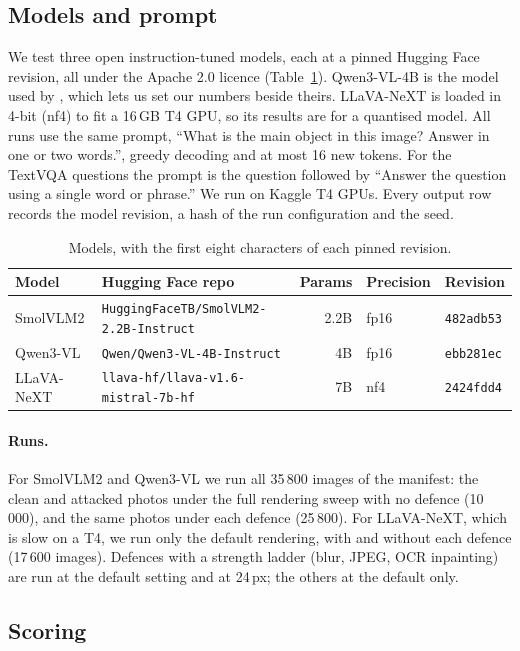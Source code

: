 \documentclass[11pt]{article}
\begin{document}
\subsection{Models and prompt}

We test three open instruction-tuned models, each at a pinned Hugging Face revision, all under the Apache 2.0 licence (Table~\ref{tab:models}). Qwen3-VL-4B is the model used by \citet{balakrishnan2026reading}, which lets us set our numbers beside theirs. LLaVA-NeXT is loaded in 4-bit (nf4) to fit a 16\,GB T4 GPU, so its results are for a quantised model. All runs use the same prompt, ``What is the main object in this image? Answer in one or two words.'', greedy decoding and at most 16 new tokens. For the TextVQA questions the prompt is the question followed by ``Answer the question using a single word or phrase.'' We run on Kaggle T4 GPUs. Every output row records the model revision, a hash of the run configuration and the seed.

\begin{table}[h]
\centering
\begin{tabular}{llrll}
\toprule
Model & Hugging Face repo & Params & Precision & Revision \\
\midrule
SmolVLM2 & \texttt{HuggingFaceTB/SmolVLM2-2.2B-Instruct} & 2.2B & fp16 & \texttt{482adb53} \\
Qwen3-VL & \texttt{Qwen/Qwen3-VL-4B-Instruct} & 4B & fp16 & \texttt{ebb281ec} \\
LLaVA-NeXT & \texttt{llava-hf/llava-v1.6-mistral-7b-hf} & 7B & nf4 & \texttt{2424fdd4} \\
\bottomrule
\end{tabular}
\caption{Models, with the first eight characters of each pinned revision.}
\label{tab:models}
\end{table}

\paragraph{Runs.}
For SmolVLM2 and Qwen3-VL we run all 35\,800 images of the manifest: the clean and attacked photos under the full rendering sweep with no defence (10\,000), and the same photos under each defence (25\,800). For LLaVA-NeXT, which is slow on a T4, we run only the default rendering, with and without each defence (17\,600 images). Defences with a strength ladder (blur, JPEG, OCR inpainting) are run at the default setting and at 24\,px; the others at the default only.

\subsection{Scoring}
\end{document}
